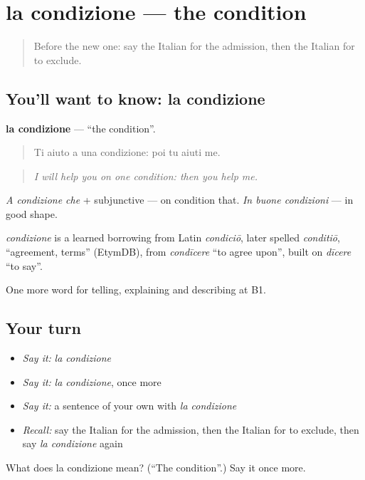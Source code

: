 \section[la condizione]{la condizione — the condition}

\label{lesson:IT-C387-condizione}



\begin{quote}
Before the new one: say the Italian for the admission, then the Italian for to exclude.
\end{quote}

\subsection*{You'll want to know: la condizione}
\textbf{la condizione} — \textquotedblleft{}the condition\textquotedblright{}.

\begin{quote}
Ti aiuto a una condizione: poi tu aiuti me.
\end{quote}

\begin{quote}
\emph{I will help you on one condition: then you help me.}
\end{quote}

\emph{A condizione che} + subjunctive — on condition that. \emph{In buone condizioni} — in good shape.

\begin{cousinweb}
\emph{condizione} is a learned borrowing from Latin \emph{condiciō}, later spelled \emph{conditiō}, \textquotedblleft{}agreement, terms\textquotedblright{} (EtymDB), from \emph{condīcere} \textquotedblleft{}to agree upon\textquotedblright{}, built on \emph{dīcere} \textquotedblleft{}to say\textquotedblright{}.
\end{cousinweb}

\begin{grammarlens}[title={What you've built}]
One more word for telling, explaining and describing at B1.
\end{grammarlens}

\subsection*{Your turn}
\begin{itemize}
\raggedright
  \item \emph{Say it:} \emph{la condizione}
  \item \emph{Say it:} \emph{la condizione}, once more
  \item \emph{Say it:} a sentence of your own with \emph{la condizione}
  \item \emph{Recall:} say the Italian for the admission, then the Italian for to exclude, then say \emph{la condizione} again
\end{itemize}

\begin{tcolorbox}[breakable,colback=teal!4,colframe=teal!35!black,title={Before you move on}]
What does la condizione mean? (\textquotedblleft{}The condition\textquotedblright{}.) Say it once more.
\end{tcolorbox}
